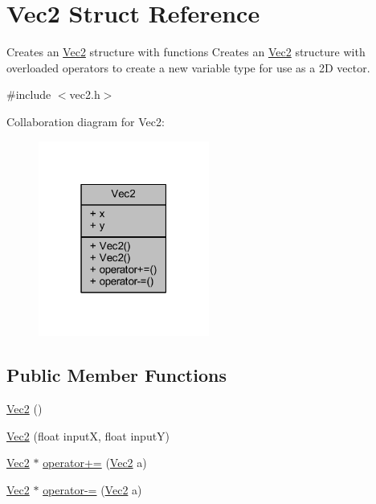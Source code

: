 \hypertarget{struct_vec2}{\section{Vec2 Struct Reference}
\label{struct_vec2}
}


Creates an \hyperlink{struct_vec2}{Vec2} structure with functions Creates an \hyperlink{struct_vec2}{Vec2} structure with overloaded operators to create a new variable type for use as a 2\+D vector.  




{\ttfamily \#include $<$vec2.\+h$>$}



Collaboration diagram for Vec2\+:\nopagebreak
\begin{figure}[H]
\begin{center}
\leavevmode
\includegraphics[width=159pt]{struct_vec2__coll__graph}
\end{center}
\end{figure}
\subsection*{Public Member Functions}
\begin{DoxyCompactItemize}
\item 
\hyperlink{struct_vec2_a76080feed7005893ecc634f903cfbae0}{Vec2} ()
\item 
\hyperlink{struct_vec2_a08e2e10202361659c3b7d003ee84ebec}{Vec2} (float input\+X, float input\+Y)
\item 
\hyperlink{struct_vec2}{Vec2} $\ast$ \hyperlink{struct_vec2_a00055ba3b91ef5faeaeb12a4289572f6}{operator+=} (\hyperlink{struct_vec2}{Vec2} a)
\item 
\hyperlink{struct_vec2}{Vec2} $\ast$ \hyperlink{struct_vec2_a6171d807b945b23574c33d6ddf1af74a}{operator-\/=} (\hyperlink{struct_vec2}{Vec2} a)
\end{DoxyCompactItemize}

